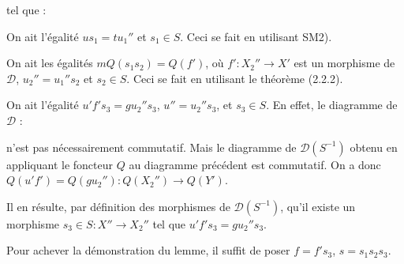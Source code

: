 \clearpage
{}%
\begingroup
\small
\setlength{\parskip}{0pt}%
\setlength{\emergencystretch}{1.5em}%
\setlength{\abovedisplayskip}{1pt plus 1pt minus 1pt}%
\setlength{\belowdisplayskip}{1pt plus 1pt minus 1pt}%

\noindent tel que :

\par\noindent{}On ait l'égalité $us_1=tu_1''$ et
$s_1\in S$. Ceci se fait en utilisant SM2).

\par\noindent{}On ait les égalités
$mQ(s_1s_2)=Q(f')$, où $f'\colon X_2''\longrightarrow X'$ est un
morphisme de $\mathcal D$, $u_2''=u_1''s_2$ et $s_2\in S$. Ceci se fait
en utilisant le théorème (2.2.2).

\par\noindent{}On ait l'égalité
$u'f's_3=gu_2''s_3$, $u''=u_2''s_3$, et $s_3\in S$. En effet, le
diagramme de $\mathcal D$ :

\begin{center}
\end{center}

\noindent n'est pas nécessairement commutatif. Mais le diagramme de
$\mathcal D(S^{-1})$ obtenu en appliquant le foncteur $Q$ au diagramme
précédent est commutatif. On a donc
$Q(u'f')=Q(gu_2'')\colon Q(X_2'')\longrightarrow Q(Y')$.

Il en résulte, par définition des morphismes de $\mathcal D(S^{-1})$,
qu'il existe un morphisme $s_3\in S\colon X''\longrightarrow X_2''$ tel
que $u'f's_3=gu_2''s_3$.

Pour achever la démonstration du lemme, il suffit de poser
$f=f's_3$, $s=s_1s_2s_3$.

